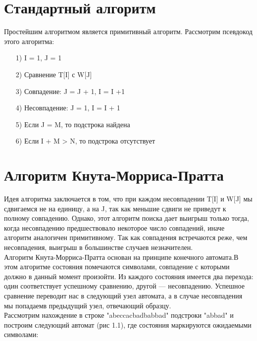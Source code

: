 \documentclass[12pt]{report}
\begin{document}
\section{Стандартный алгоритм}

Простейшим алгоритмом является примитивный алгоритм. Рассмотрим псевдокод этого алгоритма:\\

\begin{enumerate}
\item[1)] I = 1, J = 1 
\item[2)] Сравнение T[I] с W[J] 
\item[3)] Совпадение: J = J + 1, I = I +1 
\item[4)] Несовпадение: J = 1, I = I + 1 
\item[5)] Если J = M, то подстрока найдена
\item[6)] Если I + M > N, то подстрока отсутствует
\end{enumerate}

\section{Алгоритм Кнута-Морриса-Пратта}

Идея алгоритма заключается в том, что при каждом несовпадении T[I] и W[J] мы сдвигаемся не на единицу, а на J, так как меньшие сдвиги не приведут к полному совпадению. Однако, этот алгоритм поиска дает выигрыш только тогда, когда несовпадению предшествовало некоторое число совпадений, иначе алгоритм аналогичен примитивному. Так как совпадения встречаются реже, чем несовпадения, выигрыш в большинстве случаев незначителен. \\
Алгоритм Кнута-Морриса-Пратта основан на принципе конечного автомата.В этом алгоритме состояния помечаются символами, совпадение с которыми должно в данный момент произойти. Из каждого состояния имеется два перехода: один соответствует успешному сравнению, другой — несовпадению. Успешное сравнение переводит нас в следующий узел автомата, а в случае несовпадения мы попадаемв предыдущий узел, отвечающий образцу. \\

Рассмотрим нахождение в строке "abeccacbadbabbad" подстроки "abbad" и построим следующий автомат (рис 1.1), где состояния маркируются ожидаемыми символами:\\
\end{document}
